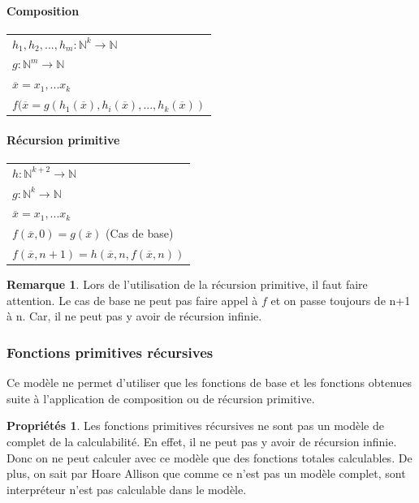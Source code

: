 \documentclass[11pt,a4paper]{article}
\newcommand{\stcomp}[1]{\overline{#1}}
\newcommand{\N}{\mathbb{N}}
\theoremstyle{definition}
\newtheorem{myprop}[mydef]{Propriétés}
\newtheorem{myrem}[mydef]{Remarque}
\begin{document}
\paragraph{Composition}
\begin{tabular}{|l|}
	\hline
	$h_1, h_2,...,h_m: \N^k \rightarrow \N$\\
	$g: \N^m \rightarrow \N$\\
	$\stcomp{x} =x_1,...x_k$ \\
	$f(\overline{x} = 
	g(h_1(\overline{x}),h_i(\overline{x}),...,h_k(\overline{x}))$\\
	\hline
\end{tabular}

\paragraph{Récursion primitive}
\begin{tabular}{|l|}
	\hline
	$h: \N^{k+2} \rightarrow \N$\\
	$g: \N^k \rightarrow \N$\\
	$\stcomp{x} =x_1,...x_k$ \\
	$f(\overline{x}, 0) = g(\overline{x})$ (Cas de base)\\
	$f(\overline{x}, n+1) = 
	h(\overline{x},n, f(\overline{x}, n))$\\
	\hline
\end{tabular}

\begin{myrem}
	Lors de l'utilisation de la récursion primitive, il faut faire 
	attention. Le cas de base ne peut pas faire appel à $f$ et on passe 
	toujours de n+1 à n. Car, il ne peut pas y avoir de récursion infinie.
\end{myrem}

\subsubsection{Fonctions primitives récursives}
Ce modèle ne permet d'utiliser que les fonctions de base et les fonctions 
obtenues suite à l'application de composition ou de récursion primitive.

\begin{myprop}
	Les fonctions primitives récursives ne sont pas un modèle de complet de 
	la calculabilité. En effet, il ne peut pas y avoir de récursion 
	infinie. Donc on ne peut calculer avec ce modèle que des fonctions 
	totales calculables. De plus, on sait par Hoare Allison que comme ce 
	n'est pas un modèle complet, sont interpréteur n'est pas calculable 
	dans le modèle.
\end{myprop}
\end{document}
